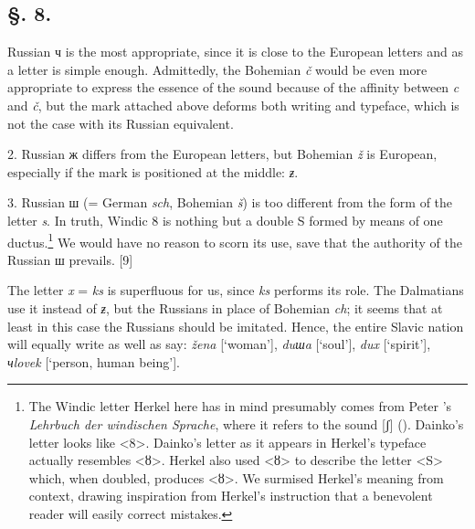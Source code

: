 \subsection*{\hspace*{\fill}§. 8.\hspace*{\fill}}
\label{sec:3-1-8}

\indent {}Russian ч is the most appropriate, since it is close to the European letters and as a letter is simple enough. Admittedly, the Bohemian \textit{č} would be even more appropriate to express the essence of the sound because of the affinity between \textit{c} and \textit{č}, but the mark attached above deforms both writing and typeface, which is not the case with its Russian equivalent.

2. Russian ж differs from the European letters, but Bohemian \textit{ž} is European, especially if the mark is positioned at the middle: \textit{ƶ}.

3. Russian ш (= German \textit{sch}, Bohemian \textit{š}) is too different from the form of the letter \textit{s}. In truth, Windic 8 is nothing but a double S formed by means of one ductus.\footnote{The Windic letter Herkel here has in mind presumably comes from Peter \citeauthor{dainko_lehrbuch_1824}’s \citeyear{dainko_lehrbuch_1824} \textit{Lehrbuch der windischen Sprache}, where it refers to the sound [ʃ] (\citeyear[2]{dainko_lehrbuch_1824}). Dainko’s letter looks like <8>. Dainko’s letter as it appears in Herkel’s typeface actually resembles <ȣ>. Herkel also used <ȣ> to describe the letter <S> which, when doubled, produces <ȣ>. We surmised Herkel’s meaning from context, drawing inspiration from Herkel’s instruction that a benevolent reader will easily correct mistakes.} We would have no reason to scorn its use, save that the authority of the Russian ш prevails. [9]

The letter \textit{x} = \textit{ks} is superfluous for us, since \textit{ks} performs its role. The Dalmatians use it instead of \textit{ƶ}, but the Russians in place of Bohemian \textit{ch}; it seems that at least in this case the Russians should be imitated. Hence, the entire Slavic nation will equally write as well as say: \textit{žena} [‘woman’], \textit{duшa} [‘soul’], \textit{dux} [‘spirit’], \textit{чlovek} [‘person, human being’].

